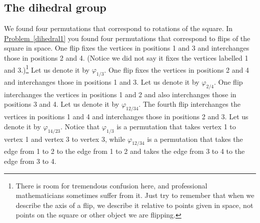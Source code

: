 \documentclass[10pt,]{book}
\theoremstyle{plain}
\theoremstyle{definition}
\numberwithin{equation}{chapter}
\begin{document}
\subsection[{The dihedral group}]{The dihedral group}\label{subsection-61}
We found four permutations that correspond to rotations of the square. In \hyperref[dihedral1]{Problem~\ref{dihedral1}} you found four permutations that correspond to flips of the square in space. One flip fixes the vertices in positions 1 and 3 and interchanges those in positions 2 and 4. (Notice we did not say it fixes the vertices labelled 1 and 3.)\footnote{There is room for tremendous confusion here, and professional mathematicians sometimes suffer from it.  Just try to remember that when we describe the axis of a flip, we describe it relative to points given in space, not points on the square or other object we are flipping.\label{fn-19}} Let us denote it by \(\varphi_{1/3}\). One flip fixes the vertices in positions 2 and 4 and interchanges those in positions 1 and 3. Let us denote it by \(\varphi_{2/4}\). One flip interchanges the vertices in positions 1 and 2 and also interchanges those in positions 3 and 4. Let us denote it by \(\varphi_{12/34}\). The fourth flip interchanges the vertices in positions 1 and 4 and interchanges those in positions 2 and 3. Let us denote it by \(\varphi_{14/23}\). Notice that \(\varphi_{1/3}\) is a permutation that takes vertex 1 to vertex 1 and vertex 3 to vertex 3, while \(\varphi_{12/34}\) is a permutation that takes the edge from 1 to 2 to the edge from 1 to 2 and takes the edge from 3 to 4 to the edge from 3 to 4.%
\end{document}

